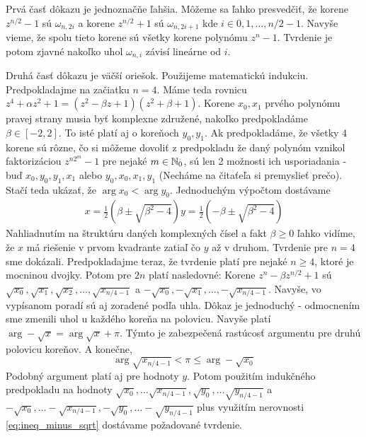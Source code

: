 \begin{dokaz}
Prvá časť dôkazu je jednoznačňe ľahšia. Môžeme sa ľahko presvedčiť, že korene
$z^{n/2}-1$ sú $\omega_{n,2i}$ a korene $z^{n/2}+1$ sú
$\omega_{n,2i+1}$ kde $i\in 0,1,\dots, n/2-1$. Navyše vieme, že spolu
tieto korene sú všetky korene polynómu $z^n-1$. Tvrdenie je potom
zjavné nakoľko uhol $\omega_{n,i}$ závisí lineárne od $i$.

Druhá časť dôkazu je väčší oriešok. Použijeme matematickú indukciu.
Predpokladajme na začiatku $n=4$.
Máme teda rovnicu
$z^4 + \alpha z^2 + 1 = (z^2 - \beta z + 1)(z^2 + \beta + 1)$.
Korene $x_0,x_1$ prvého polynómu pravej strany musia byť komplexne
združené, nakoľko predpokladáme $\beta\in[-2,2]$. To isté platí
aj o koreňoch $y_0,y_1$. Ak predpokladáme, že všetky 4 korene sú
rôzne, čo si môžeme dovoliť z predpokladu že daný polynóm vznikol
faktorizáciou $z^{n 2^m} -1$ pre nejaké $m\in\mathbb{N}_0$,
sú len 2 možnosti ich usporiadania -
buď $x_0,y_0,y_1,x_1$ alebo $y_0,x_0,x_1,y_1$ (Necháme na čitaťeľa si
premyslieť prečo). Stačí teda ukázať, že $\arg x_0 < \arg y_0$.
Jednoduchým výpočtom dostávame 
\begin{align}
    x = \frac{1}{2} (\beta \pm \sqrt{\beta^2 - 4})
    y = \frac{1}{2} (-\beta \pm \sqrt{\beta^2 - 4})
\end{align}
Nahliadnutím na štruktúru daných komplexných čísel a fakt $\beta\ge0$
ľahko vidíme, že $x$ má riešenie v prvom kvadrante zatiaľ čo $y$ až v
druhom. Tvrdenie pre $n=4$ sme dokázali.
Predpokladajme teraz, že tvrdenie platí pre nejaké $n\ge4$, ktoré je
mocninou dvojky.
Potom pre $2n$ platí nasledovné:
Korene $z^n - \beta z^{n/2} + 1$ sú $\sqrt{x_0},\sqrt{x_1},\sqrt{x_2},
\dots,\sqrt{x_{n/4-1}}$ a $ -\sqrt{x_0}, -\sqrt{x_1}, \dots,
-\sqrt{x_{n/4-1}}$. Navyše, vo vypísanom poradí sú aj zoradené podľa
uhla. Dôkaz je jednoduchý - odmocnením sme zmenili uhol u každého
koreňa na polovicu. Navyše platí $\arg -\sqrt{x}=\arg \sqrt{x} + \pi$.
Týmto je zabezpečená rastúcosť argumentu pre druhú polovicu koreňov.
A konečne, 
\begin{equation}
    \arg \sqrt{x_{n/4-1}} < \pi \le \arg -\sqrt{x_0}
    \label{eq:ineq_minus_sqrt}
\end{equation}
Podobný argument platí aj pre hodnoty $y$. Potom použitím indukčného
predpokladu na hodnoty 
$\sqrt{x_0},\dots \sqrt{x_{n/4-1}},
 \sqrt{y_0},\dots \sqrt{y_{n/4-1}}$ a
$-\sqrt{x_0},\dots -\sqrt{x_{n/4-1}},
 -\sqrt{y_0},\dots -\sqrt{y_{n/4-1}}$ plus
 využitím nerovnosti \ref{eq:ineq_minus_sqrt} dostávame požadované
 tvrdenie.
\end{dokaz}

